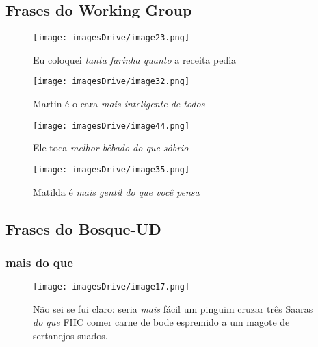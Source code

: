 \documentclass[output=paper,colorlinks,citecolor=brown]{langscibook}
\begin{document}
	\subsection{Frases do Working Group}
	
	\begin{figure}
	    \centering
	    \texttt{[image: imagesDrive/image23.png]}
	    \caption{Eu coloquei \emph{tanta farinha quanto} a receita pedia}
	    \label{fig:comparative1}
	    \end{figure}{}
	
	\begin{figure}
	    \centering
	    \texttt{[image: imagesDrive/image32.png]}
	    \caption{Martin é o cara \emph{mais inteligente de todos}}
	    \label{fig:comparative2}
	\end{figure}{}

	\begin{figure}
	    \centering
	    \texttt{[image: imagesDrive/image44.png]}
	    \caption{Ele toca \emph{melhor bêbado do que sóbrio}}
	    \label{fig:comparative3}
	\end{figure}{}

	\begin{figure}
	    \centering
	    \texttt{[image: imagesDrive/image35.png]}
	    \caption{Matilda é \emph{mais gentil do que você pensa}}
	    \label{fig:comparative4}
	\end{figure}{}

	\subsection{Frases do Bosque-UD}

	\subsubsection{mais do que}

	\begin{figure}
	    \centering
	    \texttt{[image: imagesDrive/image17.png]}
	    \caption{Não sei se fui claro: seria \emph{mais} fácil um pinguim cruzar três Saaras \emph{do que} FHC comer carne de bode espremido a um magote de sertanejos suados.}
	    \label{fig:comparative4}
	\end{figure}{}
\end{document}
